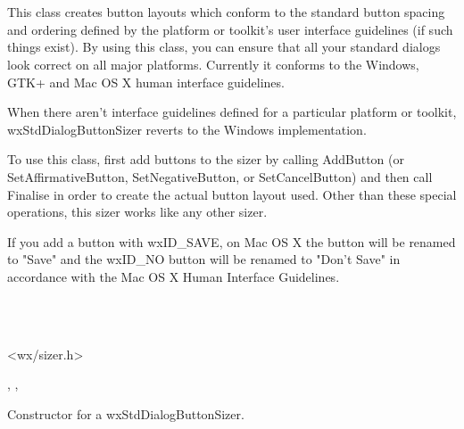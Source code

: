 \section{}\label{wxstddialogbuttonsizer}

This class creates button layouts which conform to the standard button spacing and ordering defined by the platform
or toolkit's user interface guidelines (if such things exist). By using this class, you can ensure that all your
standard dialogs look correct on all major platforms. Currently it conforms to the Windows, GTK+ and Mac OS X
human interface guidelines.

When there aren't interface guidelines defined for a particular platform or toolkit, wxStdDialogButtonSizer reverts
to the Windows implementation. 

To use this class, first add buttons to the sizer by calling AddButton (or SetAffirmativeButton, SetNegativeButton,
or SetCancelButton) and then call Finalise in order to create the actual button layout used. Other than these special
operations, this sizer works like any other sizer. 

If you add a button with wxID\_SAVE, on Mac OS X the button will be renamed to "Save" and
the wxID\_NO button will be renamed to "Don't Save" in accordance with the Mac OS X Human Interface Guidelines.


\\
\\


<wx/sizer.h>


, , 

\label{wxstddialogbuttonsizerctor}


Constructor for a wxStdDialogButtonSizer.

\label{wxstddialogbuttonsizeraddbutton}


